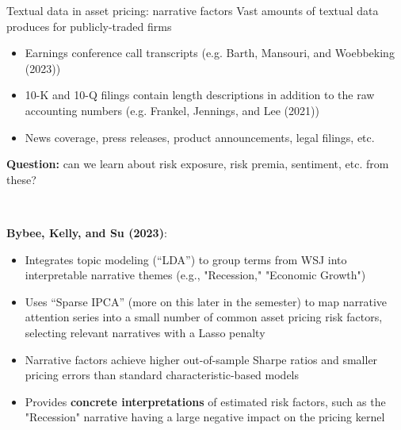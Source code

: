 \documentclass[xcolor=table, aspectratio=169]{beamer}
\newcommand{\alertbf}[1]{\alert{\textbf{#1}}}
\begin{document}
\begin{frame}{Textual data in asset pricing: narrative factors}
Vast amounts of textual data produces for publicly-traded firms
\begin{itemize}
    \item Earnings conference call transcripts (e.g. Barth, Mansouri, and Woebbeking (2023))
    \item 10-K and 10-Q filings contain length descriptions in addition to the raw accounting numbers (e.g. Frankel, Jennings, and Lee (2021))
    \item News coverage, press releases, product announcements, legal filings, etc.
\end{itemize}
\alertbf{Question:} can we learn about risk exposure, risk premia, sentiment, etc. from these?

~

\alertbf{Bybee, Kelly, and Su (2023)}:
    \begin{itemize}
        \item Integrates topic modeling (``LDA'') to group terms from WSJ into interpretable narrative themes (e.g., "Recession," "Economic Growth")
        \item Uses ``Sparse IPCA'' (more on this later in the semester) to map narrative attention series into a small number of common asset pricing risk factors, selecting relevant narratives with a Lasso penalty
        \item Narrative factors achieve higher out-of-sample Sharpe ratios and smaller pricing errors than standard characteristic-based models
        \item Provides \alertbf{concrete interpretations} of estimated risk factors, such as the "Recession" narrative having a large negative impact on the pricing kernel
    \end{itemize}
\end{frame}
\end{document}
